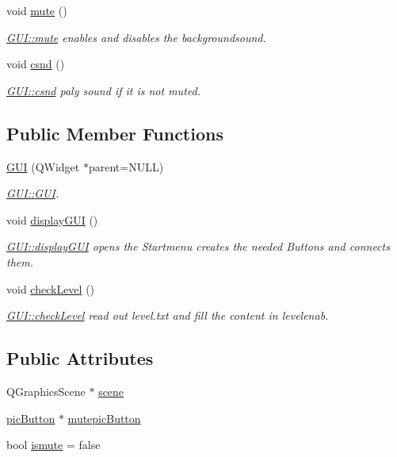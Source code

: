 \begin{DoxyCompactItemize}
void \hyperlink{class_g_u_i_a8d3a63c2c3c112592bd7642da43b837b}{mute} ()
\begin{DoxyCompactList}\small\item\em \hyperlink{class_g_u_i_a8d3a63c2c3c112592bd7642da43b837b}{G\+U\+I\+::mute} enables and disables the backgroundsound. \end{DoxyCompactList}\item 
void \hyperlink{class_g_u_i_a4a69fe3a2286ff41bb870c4d387f5aff}{csnd} ()
\begin{DoxyCompactList}\small\item\em \hyperlink{class_g_u_i_a4a69fe3a2286ff41bb870c4d387f5aff}{G\+U\+I\+::csnd} paly sound if it is not muted. \end{DoxyCompactList}\end{DoxyCompactItemize}
\subsection*{Public Member Functions}
\begin{DoxyCompactItemize}
\item 
\hyperlink{class_g_u_i_a9524032d755910ed7cf4834ecf39dc42}{G\+UI} (Q\+Widget $\ast$parent=N\+U\+LL)
\begin{DoxyCompactList}\small\item\em \hyperlink{class_g_u_i_a9524032d755910ed7cf4834ecf39dc42}{G\+U\+I\+::\+G\+UI}. \end{DoxyCompactList}\item 
void \hyperlink{class_g_u_i_a329ff5d6462e5491f309830b4eee25f7}{display\+G\+UI} ()
\begin{DoxyCompactList}\small\item\em \hyperlink{class_g_u_i_a329ff5d6462e5491f309830b4eee25f7}{G\+U\+I\+::display\+G\+UI} opens the Startmenu creates the needed Buttons and connects them. \end{DoxyCompactList}\item 
void \hyperlink{class_g_u_i_acf0edc3e3efe914e04e0dcb416cf29f1}{check\+Level} ()
\begin{DoxyCompactList}\small\item\em \hyperlink{class_g_u_i_acf0edc3e3efe914e04e0dcb416cf29f1}{G\+U\+I\+::check\+Level} read out level.\+txt and fill the content in levelenab. \end{DoxyCompactList}\end{DoxyCompactItemize}
\subsection*{Public Attributes}
\begin{DoxyCompactItemize}
\item 
Q\+Graphics\+Scene $\ast$ \hyperlink{class_g_u_i_a52022e4c94d0e0378ed17b2348ed02db}{scene}
\item 
\hyperlink{classpic_button}{pic\+Button} $\ast$ \hyperlink{class_g_u_i_a7ad3ce9d9430e60063a1df9c21c21b41}{mutepic\+Button}
\item 
bool \hyperlink{class_g_u_i_ab44acd2396d4e2cb0cd8d285a58746d1}{ismute} = false
\end{DoxyCompactItemize}


